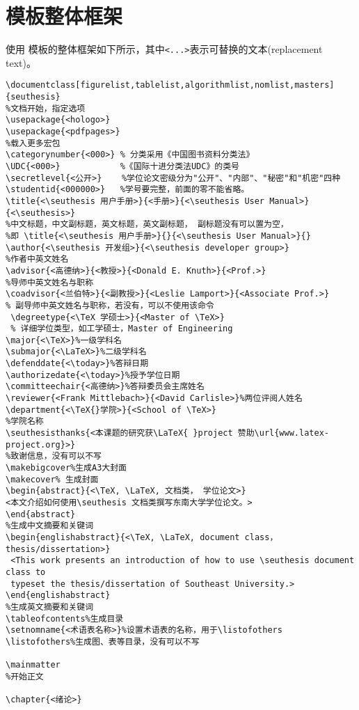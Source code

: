 ﻿\documentclass[figurelist,tablelist,algorithmlist,nomlist,masters]{seuthesis}
\begin{document}
\section{模板整体框架}
使用 \seuthesis 模板的整体框架如下所示，其中\verb+<...>+表示可替换的文本(replacement text)。
{\color{magenta}
\begin{verbatim}
\documentclass[figurelist,tablelist,algorithmlist,nomlist,masters]{seuthesis}
%文档开始，指定选项
\usepackage{<hologo>}
\usepackage{<pdfpages>}
%载入更多宏包
\categorynumber{<000>} % 分类采用《中国图书资料分类法》
\UDC{<000>}            %《国际十进分类法UDC》的类号
\secretlevel{<公开>}    %学位论文密级分为"公开"、"内部"、"秘密"和"机密"四种
\studentid{<000000>}   %学号要完整，前面的零不能省略。
\title{<\seuthesis 用户手册>}{<手册>}{<\seuthesis User Manual>}{<\seuthesis>}
%中文标题，中文副标题，英文标题，英文副标题， 副标题没有可以置为空， 
%即 \title{<\seuthesis 用户手册>}{}{<\seuthesis User Manual>}{}
\author{<\seuthesis 开发组>}{<\seuthesis developer group>}
%作者中英文姓名
\advisor{<高德纳>}{<教授>}{<Donald E. Knuth>}{<Prof.>}
%导师中英文姓名与职称
\coadvisor{<兰伯特>}{<副教授>}{<Leslie Lamport>}{<Associate Prof.>} 
% 副导师中英文姓名与职称，若没有，可以不使用该命令
 \degreetype{<\TeX 学硕士>}{<Master of \TeX>} 
 % 详细学位类型，如工学硕士，Master of Engineering
\major{<\TeX>}%一级学科名
\submajor{<\LaTeX>}%二级学科名
\defenddate{<\today>}%答辩日期
\authorizedate{<\today>}%授予学位日期
\committeechair{<高德纳>}%答辩委员会主席姓名
\reviewer{<Frank Mittlebach>}{<David Carlisle>}%两位评阅人姓名
\department{<\TeX{}学院>}{<School of \TeX>}
%学院名称
\seuthesisthanks{<本课题的研究获\LaTeX{ }project 赞助\url{www.latex-project.org}>}
%致谢信息，没有可以不写
\makebigcover%生成A3大封面
\makecover% 生成封面
\begin{abstract}{<\TeX, \LaTeX, 文档类， 学位论文>}
<本文介绍如何使用\seuthesis 文档类撰写东南大学学位论文。>
\end{abstract}
%生成中文摘要和关键词
\begin{englishabstract}{<\TeX, \LaTeX, document class， thesis/dissertation>}
 <This work presents an introduction of how to use \seuthesis document class to 
 typeset the thesis/dissertation of Southeast University.>
\end{englishabstract}
%生成英文摘要和关键词
\tableofcontents%生成目录
\setnomname{<术语表名称>}%设置术语表的名称，用于\listofothers
\listofothers%生成图、表等目录，没有可以不写

\mainmatter
%开始正文

\chapter{<绪论>}

\end{verbatim}}
\end{document}
